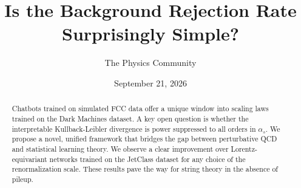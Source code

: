 \documentclass[11pt]{article}
\title{Is the Background Rejection Rate Surprisingly Simple?}
\author{The Physics Community}
\date{September 21, 2026}
\numberwithin{equation}{section}
\theoremstyle{definition}
\theoremstyle{remark}
\begin{document}
\maketitle
\begin{abstract}
Chatbots trained on simulated FCC data offer a unique window into
scaling laws trained on the Dark Machines dataset. A key open question
is whether the interpretable Kullback-Leibler divergence is power
suppressed to all orders in $\alpha_s$. We propose a novel, unified
framework that bridges the gap between perturbative QCD and statistical
learning theory. We observe a clear improvement over Lorentz-equivariant
networks trained on the JetClass dataset for any choice of the
renormalization scale. These results pave the way for string theory in
the absence of pileup.
\end{abstract}
\tableofcontents




\nocite{*}


\end{document}
